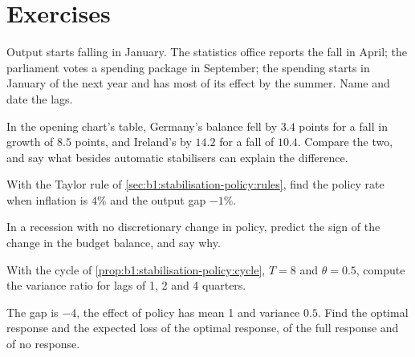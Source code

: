 \section*{Exercises}\label{sec:b1:stabilisation-policy:exercises}

\begin{exercise}[$\star$]\label{exo:b1:stabilisation-policy:three}
Output starts falling in January. The statistics office reports the fall
in April; the parliament votes a spending package in September; the
spending starts in January of the next year and has most of its effect by
the summer. Name and date the lags.
\end{exercise}

\begin{exercise}[$\star$]\label{exo:b1:stabilisation-policy:read}
In the opening chart's table, Germany's balance fell by $3.4$ points for a fall
in growth of $8.5$ points, and Ireland's by $14.2$ for a fall of $10.4$.
Compare the two, and say what besides automatic stabilisers can explain
the difference.
\end{exercise}

\begin{exercise}[$\star$]\label{exo:b1:stabilisation-policy:taylor}
With the Taylor rule of \cref{sec:b1:stabilisation-policy:rules}, find the
policy rate when inflation is $4\%$ and the output gap $-1\%$.
\end{exercise}

\begin{exercise}[$\star$]\label{exo:b1:stabilisation-policy:sign}
In a recession with no discretionary change in policy, predict the sign of
the change in the budget balance, and say why.
\end{exercise}

\begin{exercise}[$\star\star$]\label{exo:b1:stabilisation-policy:cycle-ex}
With the cycle of \cref{prop:b1:stabilisation-policy:cycle}, $T = 8$ and $\theta = 0.5$,
compute the variance ratio for lags of 1, 2 and 4 quarters.
\end{exercise}

\begin{exercise}[$\star\star$]\label{exo:b1:stabilisation-policy:uncertain}
The gap is $-4$, the effect of policy has mean 1 and variance $0.5$. Find the
optimal response and the expected loss of the optimal response, of the full
response and of no response.
\end{exercise}

